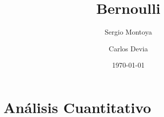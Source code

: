 \documentclass[a4paper, amsfonts, amssymb, amsmath, reprint, showkeys, nofootinbib, twoside]{revtex4-1}
\begin{document}
\title{Bernoulli}


\author{Sergio Montoya}

  
\author{Carlos Devia}


\date{\today} %

\maketitle

\section{Análisis Cuantitativo}
\end{document}

